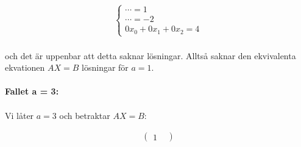 \documentclass{article}
\begin{document}
\begin{gather*}
  \begin{cases}
    \cdots = 1 \\
    \cdots = -2 \\
    0x_{0} + 0x_{1} + 0x_{2} = 4
  \end{cases}
\end{gather*}
\\
och det är uppenbar att detta saknar lösningar. Alltså saknar den ekvivalenta ekvationen $AX = B$ lösningar för $a = 1$.
\\
\\
\textbf{Fallet a = 3:}
\\
\\
Vi låter $a = 3$ och betraktar $AX = B$:

\begin{gather*}
  \begin{pmatrix}
    1 &
  \end{pmatrix}
\end{gather*}
\end{document}
